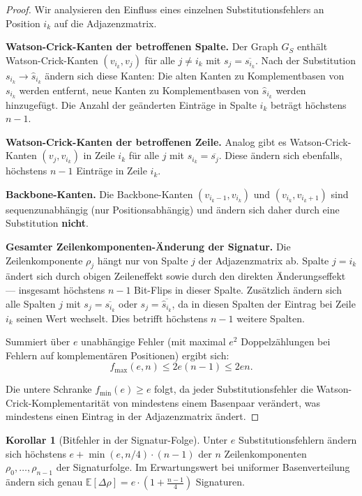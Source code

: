 ﻿\documentclass[a4paper,12pt]{article}
\theoremstyle{definition}
\newtheorem{korollar}{Korollar}
\begin{document}
\begin{proof}
    Wir analysieren den Einfluss eines einzelnen Substitutionsfehlers an
    Position $i_k$ auf die Adjazenzmatrix.

    \textbf{Watson-Crick-Kanten der betroffenen Spalte.}
    Der Graph $G_S$ enth\"{a}lt Watson-Crick-Kanten $(v_{i_k}, v_j)$ f\"{u}r
    alle $j \neq i_k$ mit $s_j = \overline{s_{i_k}}$. Nach der Substitution
    $s_{i_k} \to \hat{s}_{i_k}$ \"{a}ndern sich diese Kanten: Die alten
    Kanten zu Komplementbasen von $s_{i_k}$ werden entfernt, neue Kanten zu
    Komplementbasen von $\hat{s}_{i_k}$ werden hinzugef\"{u}gt.
    Die Anzahl der ge\"{a}nderten Eintr\"{a}ge in Spalte $i_k$ betr\"{a}gt
    h\"{o}chstens $n - 1$.

    \textbf{Watson-Crick-Kanten der betroffenen Zeile.}
    Analog gibt es Watson-Crick-Kanten $(v_j, v_{i_k})$ in Zeile $i_k$
    f\"{u}r alle $j$ mit $s_{i_k} = \overline{s_j}$. Diese \"{a}ndern sich
    ebenfalls, h\"{o}chstens $n - 1$ Eintr\"{a}ge in Zeile $i_k$.

    \textbf{Backbone-Kanten.}
    Die Backbone-Kanten $(v_{i_k - 1}, v_{i_k})$ und $(v_{i_k}, v_{i_k+1})$
    sind sequenzunabh\"{a}ngig (nur Positionsabh\"{a}ngig) und \"{a}ndern sich
    daher durch eine Substitution \textbf{nicht}.

    \textbf{Gesamter Zeilenkomponenten-\"{A}nderung der Signatur.}
    Die Zeilenkomponente $\rho_j$ h\"{a}ngt nur von Spalte $j$ der Adjazenzmatrix
    ab. Spalte $j = i_k$ \"{a}ndert sich durch obigen Zeileneffekt sowie durch
    den direkten \"{A}nderungseffekt --- insgesamt h\"{o}chstens $n-1$
    Bit-Flips in dieser Spalte. Zus\"{a}tzlich \"{a}ndern sich alle Spalten
    $j$ mit $s_j = \overline{s_{i_k}}$ oder $s_j = \overline{\hat{s}_{i_k}}$,
    da in diesen Spalten der Eintrag bei Zeile $i_k$ seinen Wert wechselt.
    Dies betrifft h\"{o}chstens $n - 1$ weitere Spalten.

    Summiert \"{u}ber $e$ unabh\"{a}ngige Fehler (mit maximal $e^2$ Doppelz\"{a}hlungen
    bei Fehlern auf komplementären Positionen) ergibt sich:
    \[
        f_{\max}(e, n) \leq 2e(n-1) \leq 2en.
    \]

    Die untere Schranke $f_{\min}(e) \geq e$ folgt, da jeder Substitutionsfehler
    die Watson-Crick-Komplementarit\"{a}t von mindestens einem Basenpaar
    ver\"{a}ndert, was mindestens einen Eintrag in der Adjazenzmatrix \"{a}ndert.
\end{proof}

\begin{korollar}[Bitfehler in der Signatur-Folge]
    \label{kor:signaturfehler}
    Unter $e$ Substitutionsfehlern \"{a}ndern sich h\"{o}chstens
    $e + \min(e, n/4) \cdot (n-1)$ der $n$ Zeilenkomponenten
    $\rho_0, \ldots, \rho_{n-1}$ der Signaturfolge. Im Erwartungswert
    bei uniformer Basenverteilung \"{a}ndern sich genau
    $\mathbb{E}[\Delta\rho] = e \cdot \left(1 + \frac{n-1}{4}\right)$
    Signaturen.
\end{korollar}
\end{document}
